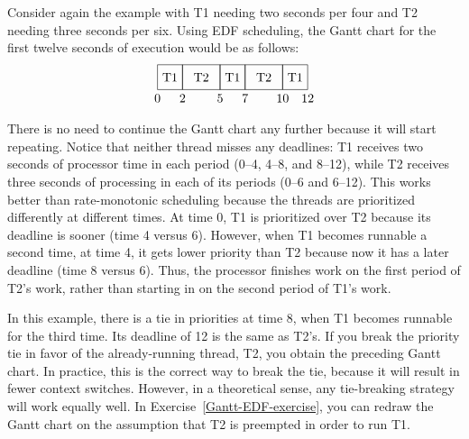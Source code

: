 Consider again the example with T1 needing two seconds per four and T2 needing three
seconds per six.
Using EDF scheduling, the Gantt chart for the first twelve seconds of
execution would be as follows:
\[\begin{tikzpicture}[scale=.035]
\draw (0,0) rectangle (20,20);
\draw (20,0) rectangle (50,20);
\draw (50,0) rectangle (70,20);
\draw (70,0) rectangle (100,20);
\draw (100,0) rectangle (120,20);
\draw (10,10) node{T1};
\draw (35,10) node{T2};
\draw (60,10) node{T1};
\draw (85,10) node{T2};
\draw (110,10) node{T1};
\draw (0,-7) node{0};
\draw (20,-7) node{2};
\draw (50,-7) node{5};
\draw (70,-7) node{7};
\draw (100,-7) node{10};
\draw (120,-7) node{12};
\end{tikzpicture}\]
\iffalse
\[\begin{graph}(130,32)(-3,-12)
\graphlinecolour{0}
\fillednodesfalse
\rectnode{a}[20,20](10,10)
\rectnode{b}[30,20](35,10)
\rectnode{c}[20,20](60,10)
\rectnode{d}[30,20](85,10)
\rectnode{e}[20,20](110,10)
\autonodetext{a}{T1}
\autonodetext{b}{T2}
\autonodetext{c}{T1}
\autonodetext{d}{T2}
\autonodetext{e}{T1}
\freetext(0,-7){0}
\freetext(20,-7){2}
\freetext(50,-7){5}
\freetext(70,-7){7}
\freetext(100,-7){10}
\freetext(120,-7){12}
\end{graph}\]
\fi
\iffalse
\begin{verbatim}
+----+-----+----+-----+----+
| T1 | T2  | T1 | T2  | T1 |
+----+-----+----+-----+----+
0    2     5    7     10   12
\end{verbatim}
\fi
There is no need to continue the Gantt chart any further because it
will start repeating.  Notice that neither thread misses any
deadlines: T1 receives two seconds of processor time in each period
(0--4, 4--8, and 8--12), while T2 receives three seconds of processing in
each of its periods (0--6 and 6--12).  This works better
than rate-monotonic scheduling because the threads are prioritized
differently at different times.  At time 0, T1 is prioritized over T2
because its deadline is sooner (time 4 versus 6).  However, when T1
becomes runnable a second time, at time 4, it gets lower priority than
T2 because now it has a later deadline (time 8 versus 6).  Thus, the processor
finishes work on the first period of T2's work, rather than starting in
on the second period of T1's work.

In this example, there is a tie in priorities at time 8, when T1
becomes runnable for the third time.  Its deadline of 12 is the same
as T2's.  If you break the priority tie in favor of the
already-running thread, T2, you obtain the preceding Gantt chart.  In
practice, this is the correct way to break the tie, because it will result
in fewer context switches.  However, in a theoretical sense, any
tie-breaking strategy will work equally well.  In Exercise~\ref{Gantt-EDF-exercise}, you can
redraw the Gantt chart on the assumption that T2 is preempted in order
to run T1.


